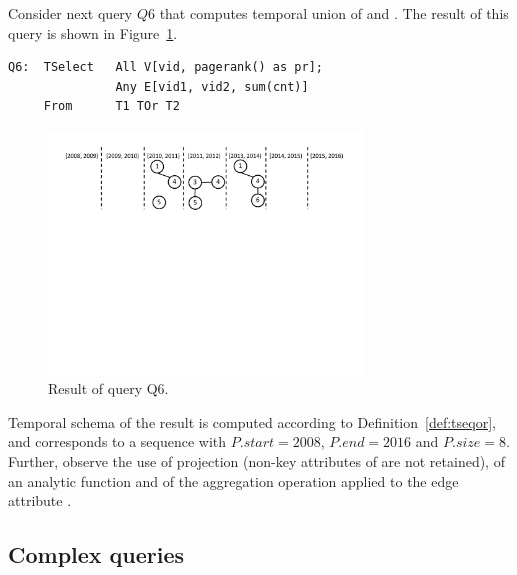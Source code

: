 
Consider next query $Q6$ that computes temporal union of 
and .  The result of this query is shown in
Figure~\ref{fig:q6}.

\begin{small}
\begin{verbatim}
Q6:  TSelect   All V[vid, pagerank() as pr]; 
               Any E[vid1, vid2, sum(cnt)]
     From      T1 TOr T2
\end{verbatim}
\end{small}

\begin{figure}
\centering
\includegraphics[width=3.3in]{figs/q6.pdf}
\vspace{-0.1in}
\caption{Result of query Q6.}
\label{fig:q6}
\vspace{-0.1in}
\end{figure}

Temporal schema of the result is computed according to
Definition~\ref{def:tseqor}, and corresponds to a sequence with
$P.start = 2008$, $P.end=2016$ and $P.size=8$.  Further, observe the
use of projection (non-key attributes of  are not retained),
of an analytic function  and of the aggregation
operation  applied to the edge attribute .

\subsection{Complex queries}
\label{sec:example:complex}

